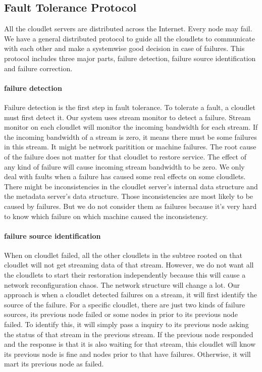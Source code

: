 \documentclass[letterpaper,twocolumn,10pt]{article}
\begin{document}
\subsection{Fault Tolerance Protocol}
All the cloudlet servers are distributed across the Internet. Every node may fail. We have a general distributed protocol to guide all the cloudlets to communicate with each other and make a systemwise good decision in case of failures. This protocol includes three major parts, failure detection, failure source identification and failure correction.

\paragraph{failure detection}
Failure detection is the first step in fault tolerance. To tolerate a fault, a cloudlet must first detect it. Our system uses stream monitor to detect a failure. Stream monitor on each cloudlet will monitor the incoming bandwidth for each stream. If the incoming bandwidth of a stream is zero, it means there must be some failures in this stream. It might be network paritition or machine failures. The root cause of the failure does not matter for that cloudlet to restore service. The effect of any kind of failure will cause incoming stream bandwidth to be zero. We only deal with faults when a failure has caused some real effects on some cloudlets. There might be inconsistencies in the cloudlet server's internal data structure and the metadata server's data structure. Those inconsistencies are most likely to be caused by failures. But we do not consider them as failures because it's very hard to know which failure on which machine caused the inconsistency.

\paragraph{failure source identification}
When on cloudlet failed, all the other cloudlets in the subtree rooted on that cloudlet will not get streaming data of that stream. However, we do not want all the cloudlets to start their restoration independently because this will cause a network reconfiguration chaos. The network structure will change a lot. Our approach is when a cloudlet detected failures on a stream, it will first identify the source of the failure. For a specific cloudlet, there are just two kinds of failure sources, its previous node failed or some nodes in prior to its previous node failed. To identify this, it will simply pass a inquiry to its previous node asking the status of that stream in the previous stream. If the previous node responded and the response is that it is also waiting for that stream, this cloudlet will know its previous node is fine and nodes prior to that have failures. Otherwise, it will mart its previous node as failed.
\end{document}
